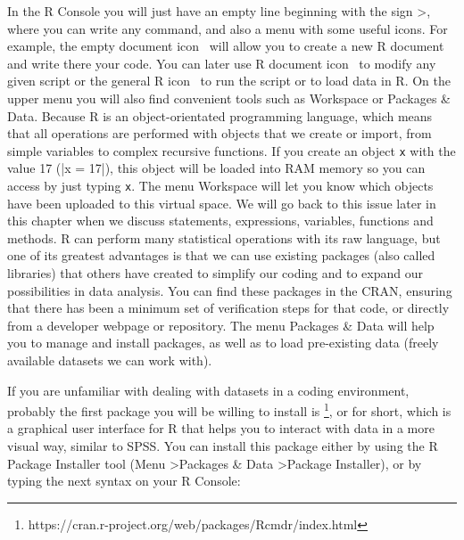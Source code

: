 In the R Console you will just have an empty line beginning with the
sign \textgreater, where you can write any command, and also a menu
with some useful icons. For example, the empty document icon \icon
\ will allow you to create a new R document and write there your
code. You can later use R document icon \doc \ to modify any given
script or the general R icon \rcom \ to run the script or to load data
in R. On the upper menu you will also find convenient tools such as
Workspace or Packages \& Data. Because R is an
object-orientated programming language, which means that all
operations are performed with objects that we create or import, from
simple variables to complex recursive functions. If you create an
object \texttt{x} with the value 17 (|x = 17|), this object will
be loaded into RAM memory so you can access by just typing \texttt{x}.
The menu Workspace will let you know which objects
have been uploaded to this virtual space. We will go back to this
issue later in this chapter when we discuss statements, expressions,
variables, functions and methods. R can perform many statistical operations with its
raw language, but one of its greatest advantages is that we can use
existing packages (also called libraries) that others have created to
simplify our coding and to expand our possibilities in data
analysis. You can find these packages in the CRAN, ensuring that there
has been a minimum set of verification steps for that code, or
directly from a developer webpage or repository. The menu Packages \&
Data will help you to manage and install packages, as well as to load
pre-existing data (freely available datasets we can work with).

If you are unfamiliar with dealing with datasets in a coding
environment, probably the first package you will be willing to install
is \footnote{https://cran.r-project.org/web/packages/Rcmdr/index.html},
or  for short, which is a graphical user interface for R that
helps you to interact with data in a more visual way, similar to SPSS.
You can install this package either by using the R Package Installer
tool (Menu \textgreater Packages \& Data \textgreater Package
Installer), or by typing the next syntax on your R Console:


